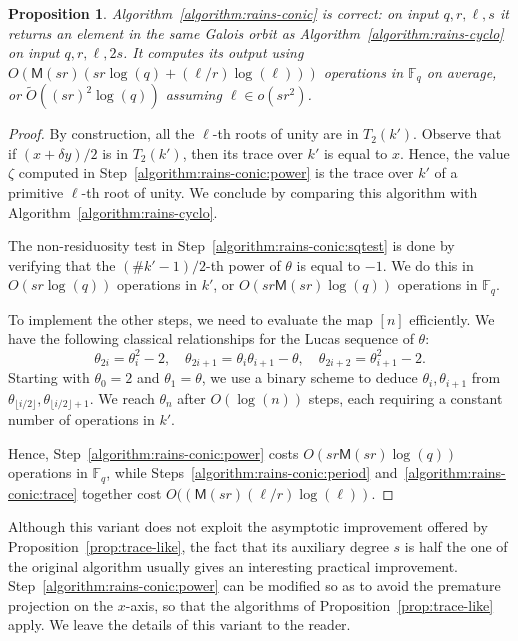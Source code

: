 \documentclass{mcom-l}
\theoremstyle{plain}
\newtheorem{proposition}[theorem]{Proposition}
\theoremstyle{definition}
\newcommand{\tildO}{\tilde{O}}
\newcommand{\F}{\ensuremath{\mathbb{F}}}
\newcommand{\MM}{\ensuremath{\mathsf{M}}}
\newcounter{algorithm}
\begin{document}
\begin{proposition}
  Algorithm~\ref{algorithm:rains-conic} is correct: on input
  $q,r,\ell,s$ it returns an element in the same Galois orbit as
  Algorithm~\ref{algorithm:rains-cyclo} on input $q,r,\ell,2s$. %
  It computes its output using $O(\MM(sr)(sr\log(q)+(\ell/r)\log(\ell)))$
  operations in $\F_q$ on average, or $\tildO((sr)^2\log(q))$ assuming
  $\ell\in o(sr^2)$.
\end{proposition}
\begin{proof}
  By construction, all the $\ell$-th roots of unity are in
  $T_2(k')$. %
  Observe that if $(x+\delta y)/2$ is in $T_2(k')$, then its trace
  over $k'$ is equal to $x$. %
  Hence, the value $\zeta$ computed in
  Step~\ref{algorithm:rains-conic:power} is the trace over $k'$ of a
  primitive $\ell$-th root of unity. %
  We conclude by comparing this algorithm with
  Algorithm~\ref{algorithm:rains-cyclo}.

  The non-residuosity test in Step~\ref{algorithm:rains-conic:sqtest}
  is done by verifying that the $(\#k'-1)/2$-th power of $\theta$ is
  equal to $-1$. %
  We do this in $O(sr\log(q))$ operations in $k'$, or
  $O(sr\MM(sr)\log(q))$ operations in $\F_q$.

  To implement the other steps, we need to evaluate the map $[n]$
  efficiently. %
  We have the following classical relationships for the Lucas sequence
  of $\theta$:
  \begin{equation*}
    \theta_{2i} = \theta_{i}^2-2,\quad
    \theta_{2i+1} = \theta_i\theta_{i+1} - \theta,\quad
    \theta_{2i+2} = \theta_{i+1}^2-2.
  \end{equation*}
  Starting with $\theta_0=2$ and $\theta_1=\theta$, we use a binary
  scheme to deduce $\theta_i,\theta_{i+1}$ from
  $\theta_{\lfloor i/2\rfloor},\theta_{\lfloor i/2\rfloor+1}$. %
  We reach $\theta_n$ after $O(\log(n))$ steps, each requiring a
  constant number of operations in $k'$.

  Hence, Step~\ref{algorithm:rains-conic:power} costs
  $O(sr\MM(sr)\log(q))$ operations in $\F_q$, while
  Steps~\ref{algorithm:rains-conic:period}
  and~\ref{algorithm:rains-conic:trace} together cost
  $O((\MM(sr)(\ell/r)\log(\ell))$.
\end{proof}

Although this variant does not exploit the asymptotic improvement
offered by Proposition~\ref{prop:trace-like}, the fact that its
auxiliary degree $s$ is half the one of the original algorithm usually
gives an interesting practical improvement. %
Step~\ref{algorithm:rains-conic:power} can be modified so as to avoid
the premature projection on the $x$-axis, so that the algorithms of
Proposition~\ref{prop:trace-like} apply. %
We leave the details of this variant to the reader.






\end{document}
